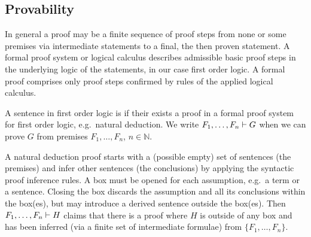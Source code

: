 
\subsection{Provability}

In general a proof may be a finite sequence of proof steps
from none or some premises via intermediate statements
to a final, the then proven statement.
A formal proof system or logical calculus describes admissible basic proof steps
in the underlying logic of the statements, in our case first order logic.
A formal proof comprises only proof steps confirmed by rules of the applied logical calculus.



\begin{definition}
	A sentence in first order logic is 
	if their exists a proof in a formal proof system for first order logic,
	e.g.~natural deduction.
	We write
	\( F_1, \ldots, F_n \vdash G \)
	when we can prove \(G\) from premises \( F_1,\ldots,F_n \), \(n\in\mathbb{N}\).
\end{definition}

A natural deduction proof starts with a (possible empty) set of sentences (the premises) and infer other sentences (the conclusions) by applying the syntactic proof inference rules.
A box must be opened for each assumption, e.g.~a term or a sentence.
Closing the box discards the assumption and all its conclusions within the box{(es)},
but may introduce a derived sentence outside the box{(es)}.
Then \( F_1,\ldots,F_n \vdash H \) claims that there is a proof where
\( H \) is outside of any box
and has been inferred (via a finite set of intermediate formulae)
from \( \{ F_1,\ldots,F_n\} \).


